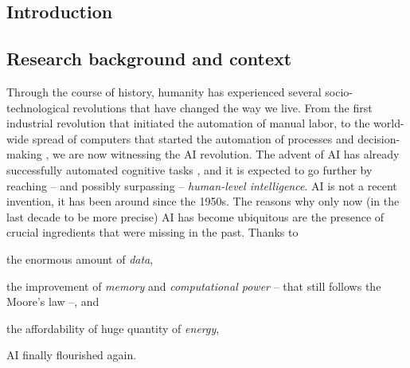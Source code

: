 
\begin{refsection}

\minitoc
\chapter{Introduction}
\label{ch:introduction}
\mtcaddchapter
\minitoc

\section{Research background and context}
\label{sec:research-background-and-context}
%
Through the course of history, humanity has experienced several socio-technological revolutions that have changed the way we live.
%
From the first industrial revolution that initiated the automation of manual labor, to the world-wide spread of computers that started the automation of processes and decision-making , we are now witnessing the \gls{AI} revolution.
%
The advent of \gls{AI} has already successfully automated cognitive tasks , and it is expected to go further by reaching -- and possibly surpassing -- \emph{human-level intelligence}.
%
\Gls{AI} is not a recent invention, it has been around since the 1950s.
%
The reasons why only now (in the last decade to be more precise) \gls{AI} has become ubiquitous are the presence of crucial ingredients that were missing in the past.
%
Thanks to
%
\begin{inlinelist}
    \item the enormous amount of \emph{data},
    \item the improvement of \emph{memory} and \emph{computational power} -- that still follows the Moore's law --, and
    \item the affordability of huge quantity of \emph{energy},
\end{inlinelist}
%
\gls{AI} finally flourished again.



\end{refsection}
